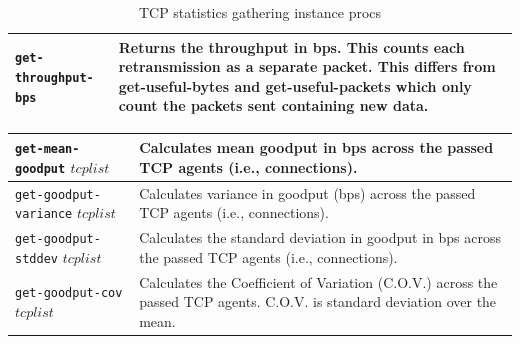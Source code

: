 \documentclass[11pt]{article}
\begin{document}
\begin{table}[ht]
\begin{center}
\begin{tabular}{|l|l|}
\verb|get-throughput-bps| &
  \begin{minipage}[c]{4in}
  \vspace{0.05in}
  Returns the throughput in bps.  This counts each retransmission as a separate
  packet.  This differs from get-useful-bytes and get-useful-packets which
  only count the packets sent containing new data.
  \vspace{0.05in}
  \end{minipage} \\ \hline
  
\end{tabular}
\end{center}
\caption{TCP statistics gathering instance procs}\label{TCPStatsTable}
\end{table}

\begin{table}[ht]
\begin{center}
\begin{tabular}{|l|l|}\hline

\verb|get-mean-goodput| $tcplist$ &
  \begin{minipage}[c]{3in}
  \vspace{0.05in}
  Calculates mean goodput in bps across the passed TCP agents 
  (i.e., connections).
  \vspace{0.05in}
  \end{minipage} \\ \hline

\verb|get-goodput-variance| $tcplist$ &
  \begin{minipage}[c]{3in}
  \vspace{0.05in}
  Calculates variance in goodput (bps) across the passed TCP agents
  (i.e., connections).
  \vspace{0.05in}
  \end{minipage} \\ \hline

\verb|get-goodput-stddev| $tcplist$ &
  \begin{minipage}[c]{3in}
  \vspace{0.05in}
  Calculates the standard deviation in goodput in bps across the
  passed TCP agents (i.e., connections).
  \vspace{0.05in}
  \end{minipage} \\ \hline

\verb|get-goodput-cov| $tcplist$ &
  \begin{minipage}[c]{3in}
  \vspace{0.05in}
  Calculates the Coefficient of Variation (C.O.V.) across the passed
  TCP agents.  C.O.V.  is standard deviation over the mean.
  \vspace{0.05in}
  \end{minipage} \\ \hline



\end{tabular}
\end{center}
\end{table}
\end{document}
